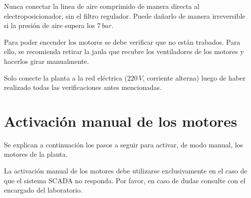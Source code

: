 \begin{lattention}
Nunca conectar la linea de aire comprimido de manera directa al
electroposicionador,
sin el filtro regulador.
Puede dañarlo de manera irreversible si la presión de aire
supera los $7\,bar$.
\end{lattention}

\begin{tcolorbox}[title=Motores]
Para poder encender los motores se debe verificar que no están trabados.
Para ello, se recomienda retirar la jaula que recubre los ventiladores
de los motores y hacerlos girar manualmente.
\end {tcolorbox}

\begin{lattention}
Solo conecte la planta a la red eléctrica ($220\,V$, corriente alterna) luego 
de haber realizado todas las verificaciones antes mencionadas. 
\end{lattention}

\section{Activación manual de los motores}
\label{anexo:motoresManual}
Se explican a continuación los pasos a seguir para activar, de modo manual, los
motores de la planta.
 \begin{lattention}
 La activación manual de los motores debe utilizarse exclusivamente en el caso
de que el sistema SCADA no responda.
Por favor, en caso de dudas consulte con el encargado del laboratorio.
\end{lattention}


